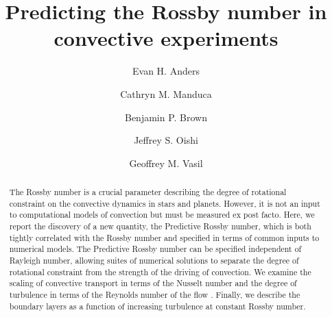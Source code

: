 \documentclass[twocolumn, amsmath, amsfonts, amssymb, trackchanges]{aastex62}
\begin{document}
\newcommand{\AB}{\citetalias{anders&brown2017}}

\title{Predicting the Rossby number in convective experiments}


\author[0000-0002-3433-4733]{Evan H. Anders}
\author{Cathryn M. Manduca}
\author[0000-0001-8935-219X]{Benjamin P. Brown}
\author[0000-0001-8531-6570]{Jeffrey S. Oishi}
\author{Geoffrey M. Vasil}


\begin{abstract}
  The Rossby number is a crucial parameter describing the degree of rotational constraint on the convective dynamics in stars and planets. 
However, it is not an input to computational models of convection but must be measured ex post facto. 
Here, we report the discovery of a new quantity, the Predictive Rossby number, which is both tightly correlated with the Rossby number and specified in terms of common inputs to numerical models. 
The Predictive Rossby number can be specified independent of Rayleigh number, allowing suites of numerical solutions to separate the degree of rotational constraint from the strength of the driving of convection.  
We examine the scaling of convective transport in terms of the Nusselt number and the degree of turbulence in terms of the Reynolds number of the flow
. 
Finally, we describe the boundary layers as a function of increasing turbulence at constant Rossby number.
\end{abstract}


\end{document}
